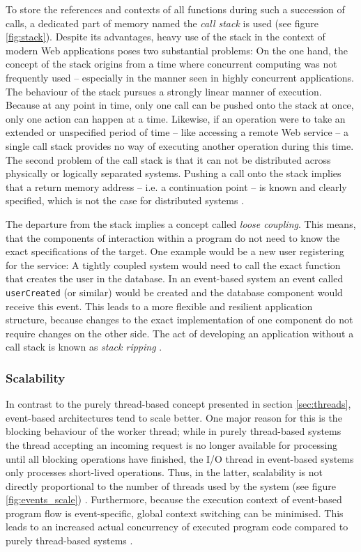 To store the references and contexts of all functions during such a succession of calls, a dedicated part of memory named the \textit{call stack} is used (see figure \ref{fig:stack}). Despite its advantages, heavy use of the stack in the context of modern Web applications poses two substantial problems: On the one hand, the concept of the stack origins from a time where concurrent computing was not frequently used -- especially in the manner seen in highly concurrent applications. The behaviour of the stack pursues a strongly linear manner of execution. Because at any point in time, only one call can be pushed onto the stack at once, only one action can happen at a time. Likewise, if an operation were to take an extended or unspecified period of time -- like accessing a remote Web service -- a single call stack provides no way of executing another operation during this time. The second problem of the call stack is that it can not be distributed across physically or logically separated systems. Pushing a call onto the stack implies that a return memory address -- i.e. a continuation point -- is known and clearly specified, which is not the case for distributed systems \cite{Hohpe2006}. 

The departure from the stack implies a concept called \textit{loose coupling}. This means, that the components of interaction within a program do not need to know the exact specifications of the target. One example would be a new user registering for the service: A tightly coupled system would need to call the exact function that creates the user in the database. In an event-based system an event called \texttt{userCreated} (or similar) would be created and the database component would receive this event. This leads to a more flexible and resilient application structure, because changes to the exact implementation of one component do not require changes on the other side. The act of developing an application without a call stack is known as \textit{stack ripping} \cite{Drolia2010}.

\subsubsection*{Scalability}
In contrast to the purely thread-based concept presented in section \ref{sec:threads}, event-based architectures tend to scale better. One major reason for this is the blocking behaviour of the worker thread; while in purely thread-based systems the thread accepting an incoming request is no longer available for processing until all blocking operations have finished, the I/O thread in event-based systems only processes short-lived operations. Thus, in the latter, scalability is not directly proportional to the number of threads used by the system (see figure \ref{fig:events_scale}) \cite[p. 2]{Carrera}. Furthermore, because the execution context of event-based program flow is event-specific, global context switching can be minimised. This leads to an increased actual concurrency of executed program code compared to purely thread-based systems \cite{Lee2006}.

